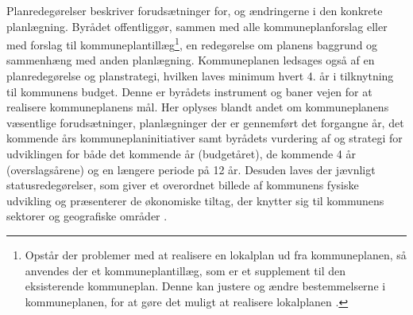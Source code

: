 \newline \indent{     }  Planredegørelser beskriver forudsætninger for, og ændringerne i den konkrete planlægning. Byrådet offentliggør, sammen med alle kommuneplanforslag eller med forslag til kommuneplantillæg\footnote{Opstår der problemer med at realisere en lokalplan ud fra kommuneplanen, så anvendes der et kommuneplantillæg, som er et supplement til den eksisterende kommuneplan. Denne kan justere og ændre bestemmelserne i kommuneplanen, for at gøre det muligt at realisere lokalplanen \citep{kommuneplan2009}.}, en redegørelse om planens baggrund og sammenhæng med anden planlægning. Kommuneplanen ledsages også af en planredegørelse og planstrategi, hvilken laves minimum hvert 4. år i tilknytning til kommunens budget. Denne er byrådets instrument og baner vejen for at realisere kommuneplanens mål. Her oplyses blandt andet om kommuneplanens væsentlige forudsætninger, planlægninger der er gennemført det forgangne år, det kommende års kommuneplaninitiativer samt byrådets vurdering af og strategi for udviklingen for både det kommende år (budgetåret), de kommende 4 år (overslagsårene) og en længere periode på 12 år. Desuden laves der jævnligt statusredegørelser, som giver et overordnet billede af kommunens fysiske udvikling og præsenterer de økonomiske tiltag, der knytter sig til kommunens sektorer og geografiske områder \citep{kommuneplan1}.

